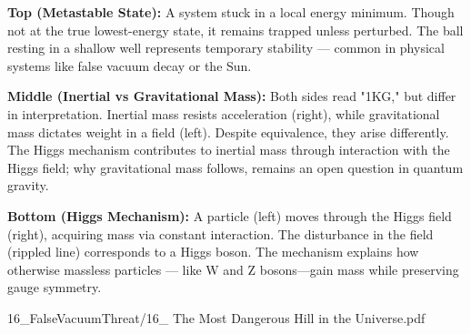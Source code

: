 \begin{SideNotePage}{
    \textbf{Top (Metastable State):}  
    A system stuck in a local energy minimum. Though not at the true lowest-energy state, it remains trapped unless perturbed. The ball resting in a shallow well represents temporary stability — common in physical systems like false vacuum decay or the Sun. \par
  
    \textbf{Middle (Inertial vs Gravitational Mass):}  
    Both sides read "1KG," but differ in interpretation. Inertial mass resists acceleration (right), while gravitational mass dictates weight in a field (left). Despite equivalence, they arise differently. The Higgs mechanism contributes to inertial mass through interaction with the Higgs field; why gravitational mass follows, remains an open question in quantum gravity. \par
  
    \textbf{Bottom (Higgs Mechanism):}  
    A particle (left) moves through the Higgs field (right), acquiring mass via constant interaction. The disturbance in the field (rippled line) corresponds to a Higgs boson. The mechanism explains how otherwise massless particles — like W and Z bosons—gain mass while preserving gauge symmetry. \par
}{16_FalseVacuumThreat/16_ The Most Dangerous Hill in the Universe.pdf}
\end{SideNotePage}
